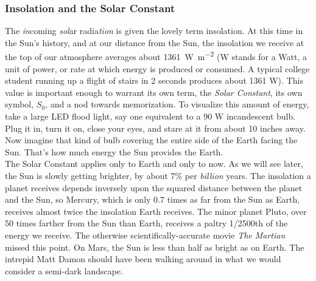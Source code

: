 \subsubsection{Insolation and the Solar Constant}
The \textit{in}coming \textit{sol}ar radia\textit{tion} is given the lovely term insolation. At this time in the Sun's history, and at our distance from the Sun, the insolation we receive at the top of our atmosphere averages about \SI{1361} {\watt\per\metre^2} (W stands for a Watt, a unit of power, or rate at which energy is produced or consumed. A typical college student running up a flight of stairs in 2 seconds produces about 1361 W). This value is important enough to warrant its own term, the \emph{Solar Constant}, its own symbol, $S_0$, and a nod towards memorization. To visualize this amount of energy, take a large LED flood light, say one equivalent to a 90 W incandescent bulb. Plug it in, turn it on, close your eyes, and stare at it from about 10 inches away.  Now imagine that kind of bulb covering the entire side of the Earth facing the Sun. That's how much energy the Sun provides the Earth.\\
The Solar Constant applies only to Earth and only to now. As we will see later, the Sun is slowly getting brighter, by about 7\% per \textit{billion} years. The insolation a planet receives depends inversely upon the squared distance between the planet and the Sun, so Mercury, which is only 0.7 times as far from the Sun as Earth, receives almost twice the insolation Earth receives. The minor planet Pluto, over 50 times farther from the Sun than Earth, receives a paltry 1/2500th of the energy we receive. The otherwise scientifically-accurate movie \textit{The Martian} missed this point. On Mars, the Sun is less than half as bright as on Earth. The intrepid Matt Damon should have been walking around in what we would consider a semi-dark landscape.

